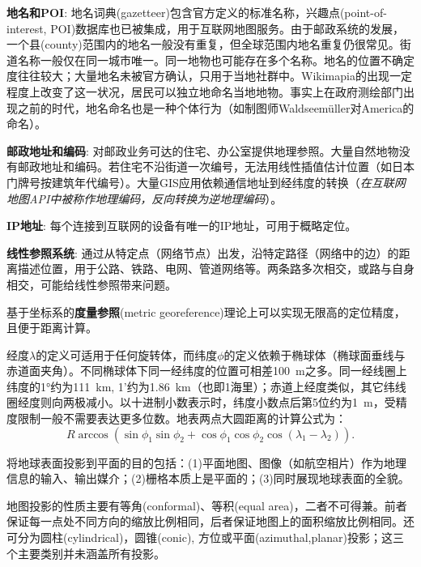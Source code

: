 \par \textbf{地名和POI}: 地名词典(gazetteer)包含官方定义的标准名称，兴趣点(point-of-interest, POI)数据库也已被集成，用于互联网地图服务。由于邮政系统的发展，一个县(county)范围内的地名一般没有重复，但全球范围内地名重复仍很常见。街道名称一般仅在同一城市唯一。同一地物也可能存在多个名称。地名的位置不确定度往往较大；大量地名未被官方确认，只用于当地社群中。Wikimapia的出现一定程度上改变了这一状况，居民可以独立地命名当地地物。事实上在政府测绘部门出现之前的时代，地名命名也是一种个体行为（如制图师Waldseem\"uller对America的命名）。

\par \textbf{邮政地址和编码}: 对邮政业务可达的住宅、办公室提供地理参照。大量自然地物没有邮政地址和编码。若住宅不沿街道一次编号，无法用线性插值估计位置（如日本门牌号按建筑年代编号）。大量GIS应用依赖通信地址到经纬度的转换（\emph{在互联网地图API中被称作地理编码，反向转换为逆地理编码}）。

\par \textbf{IP地址}: 每个连接到互联网的设备有唯一的IP地址，可用于概略定位。

\par \textbf{线性参照系统}: 通过从特定点（网络节点）出发，沿特定路径（网络中的边）的距离描述位置，用于公路、铁路、电网、管道网络等。两条路多次相交，或路与自身相交，可能给线性参照带来问题。

\par 基于坐标系的\textbf{度量参照}(metric georeference)理论上可以实现无限高的定位精度，且便于距离计算。

\par 经度$\lambda$的定义可适用于任何旋转体，而纬度$\phi$的定义依赖于椭球体（椭球面垂线与赤道面夹角）。不同椭球体下同一经纬度的位置可相差\SI{100}{\metre}之多。同一经线圈上纬度的\ang{1}约为\SI{111}{\kilo\metre}, 1’约为\SI{1.86}{\kilo\metre}（也即1海里）；赤道上经度类似，其它纬线圈经度则向两极减小。以十进制小数表示时，纬度小数点后第5位约为\SI{1}{\metre}，受精度限制一般不需要表达更多位数。地表两点大圆距离的计算公式为：
\begin{displaymath}
R\arccos (\sin\phi_1 \sin \phi_2 +\cos \phi_1 \cos \phi_2 \cos(\lambda_1-\lambda_2)).
\end{displaymath}

\par 将地球表面投影到平面的目的包括：(1)平面地图、图像（如航空相片）作为地理信息的输入、输出媒介；(2)栅格本质上是平面的；(3)同时展现地球表面的全貌。

\par 地图投影的性质主要有等角(conformal)、等积(equal area)，二者不可得兼。前者保证每一点处不同方向的缩放比例相同，后者保证地图上的面积缩放比例相同。还可分为圆柱(cylindrical)，圆锥(conic), 方位或平面(azimuthal,planar)投影；这三个主要类别并未涵盖所有投影。

